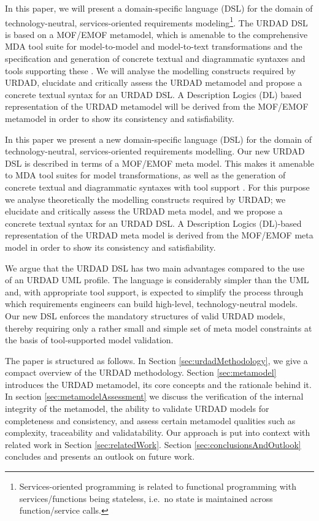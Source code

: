 In this paper, we will present a domain-specific language (DSL) for the domain of technology-neutral, services-oriented requirements modeling\footnote{Services-oriented programming is related to functional programming with services/functions being stateless, i.e.\ no state is maintained across function/service calls.}. The URDAD DSL is based on a MOF/EMOF metamodel, which is amenable to the comprehensive MDA tool suite for model-to-model and model-to-text transformations and the specification and generation of concrete textual and diagrammatic syntaxes and tools supporting these \cite{gronback_model_2008}. We will analyse the modelling constructs required by URDAD, elucidate and critically assess the URDAD metamodel and propose a concrete textual syntax for an URDAD DSL. A Description Logics (DL) based representation of the URDAD metamodel will be derived from the MOF/EMOF metamodel in order to show its consistency and satisfiability.

In this paper we present a new domain-specific language (DSL) for the domain of technology-neutral, services-oriented requirements modelling. Our new URDAD DSL is described in terms of a MOF/EMOF meta model. This makes it amenable to MDA tool suites for model transformations, as well as the generation of concrete textual and diagrammatic syntaxes with tool support \cite{gronback_model_2008}. For this purpose we analyse theoretically the modelling constructs required by URDAD; we elucidate and critically assess the URDAD meta model, and we propose a concrete textual syntax for an URDAD DSL. A Description Logics (DL)-based representation of the URDAD meta model is derived from the MOF/EMOF meta model in order to show its consistency and satisfiability.

We argue that the URDAD DSL has two main advantages compared to the use of an URDAD UML profile. The language is considerably simpler than the UML and, with appropriate tool support, is expected to simplify the process through which requirements engineers can build high-level, technology-neutral models. Our new DSL enforces the mandatory structures of valid URDAD models, thereby requiring only a rather small and simple set of meta model constraints at the basis of tool-supported model validation. 

The paper is structured as follows. In Section \ref{sec:urdadMethodology}, we give a compact overview of the URDAD methodology. Section \ref{sec:metamodel} introduces the URDAD metamodel, its core concepts and the rationale behind it. In section \ref{sec:metamodelAssessment} we discuss the verification of the internal integrity of the metamodel, the ability to validate URDAD models for completeness and consistency, and assess certain metamodel qualities such as complexity, traceability and validatability. Our approach is put into context with related work in Section \ref{sec:relatedWork}. Section \ref{sec:conclusionsAndOutlook} concludes and presents an outlook on future work.
